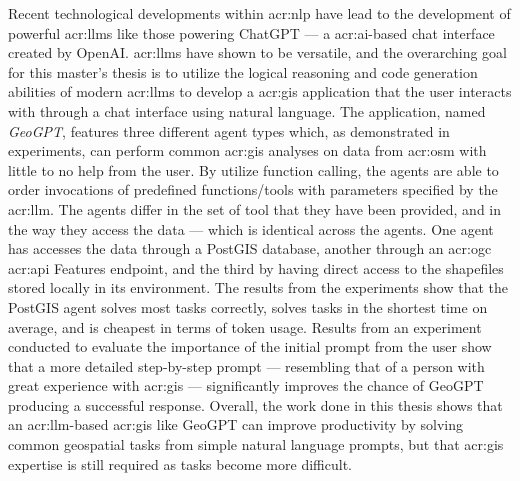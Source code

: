 Recent technological developments within \acrlong{acr:nlp} have lead to the development of powerful \glspl{acr:llm} like those powering ChatGPT --- a \acrshort{acr:ai}-based chat interface created by OpenAI. \glspl{acr:llm} have shown to be versatile, and the overarching goal for this master's thesis is to utilize the logical reasoning and code generation abilities of modern \glspl{acr:llm} to develop a \acrshort{acr:gis} application that the user interacts with through a chat interface using natural language. The application, named \textit{GeoGPT}, features three different agent types which, as demonstrated in experiments, can perform common \acrshort{acr:gis} analyses on data from \gls{acr:osm} with little to no help from the user. By utilize function calling, the agents are able to order invocations of predefined functions/tools with parameters specified by the \acrshort{acr:llm}. The agents differ in the set of tool that they have been provided, and in the way they access the data --- which is identical across the agents. One agent has accesses the data through a PostGIS database, another through an \acrshort{acr:ogc} \acrshort{acr:api} Features endpoint, and the third by having direct access to the shapefiles stored locally in its environment. The results from the experiments show that the PostGIS agent solves most tasks correctly, solves tasks in the shortest time on average, and is cheapest in terms of token usage. Results from an experiment conducted to evaluate the importance of the initial prompt from the user show that a more detailed step-by-step prompt --- resembling that of a person with great experience with \acrshort{acr:gis} --- significantly improves the chance of GeoGPT producing a successful response. Overall, the work done in this thesis shows that an \acrshort{acr:llm}-based \acrshort{acr:gis} like GeoGPT can improve productivity by solving common geospatial tasks from simple natural language prompts, but that \acrshort{acr:gis} expertise is still required as tasks become more difficult.


\glsresetall
